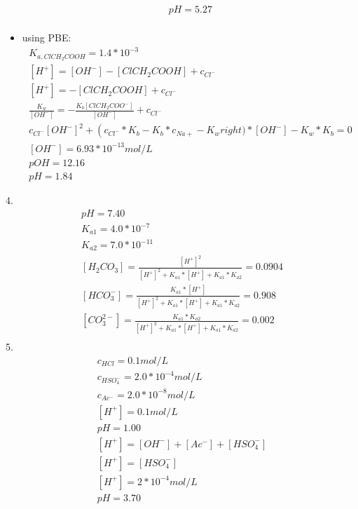 \documentclass{article}
\begin{document}
\begin{itemize}
\begin{equation}
\begin{multlined}
            pH = 5.27\\
        \end{multlined}
    \end{equation}
    \item
    using PBE:
    \begin{equation}
        \begin{multlined}
            K_{a, ClCH_2COOH} = 1.4*10^{-3}\\
            \left[H^+\right] = \left[OH^-\right] - \left[ClCH_2COOH\right] + c_{Cl^-}\\
            \left[H^+\right] = - \left[ClCH_2COOH\right] + c_{Cl^-}\\
            \frac{K_w}{\left[OH^-\right]} = -\frac{K_b\left[ClCH_2COO^-\right]}{\left[OH^-\right]} + c_{Cl^-}\\
            c_{Cl^-}\left[OH^-\right]^2 + \left(c_{Cl^-}*K_b - K_b*c_{Na+} - K_w right)*\left[OH^-\right]-K_w*K_b = 0\\
            \left[OH^-\right] = 6.93*10^{-13}mol/L\\
            pOH = 12.16\\
            pH = 1.84
        \end{multlined}
    \end{equation}
\end{itemize}
4.\begin{equation}
    \begin{multlined}
        pH = 7.40\\
        K_{a1} = 4.0*10^{-7}\\
        K_{a2} = 7.0*10^{-11}\\
        \left[H_2CO_3\right] = \frac{\left[H^+\right]^2}{\left[H^+\right]^2+ K_{a1}*\left[H^+\right]+K_{a1}*K_{a2}} = 0.0904\\
        \left[HCO_3^-\right] = \frac{K_{a1}*\left[H^+\right]}{\left[H^+\right]^2+ K_{a1}*\left[H^+\right]+K_{a1}*K_{a2}} = 0.908\\
        \left[CO_3^{2-}\right] = \frac{K_{a1}*K_{a2}}{\left[H^+\right]^2+ K_{a1}*\left[H^+\right]+K_{a1}*K_{a2}} = 0.002\\
    \end{multlined}
\end{equation}
5. \begin{equation}
    \begin{multlined}
        c_{HCl} = 0.1mol/L\\
        c_{HSO_4^-} = 2.0*10^{-4}mol/L\\
        c_{Ac^-} = 2.0*10^{-8}mol/L\\
        \left[H^+\right] = 0.1 mol/L\\
        pH = 1.00\\
        \left[H^+\right] = \left[OH^-\right] + \left[Ac^-\right] + \left[HSO_4^-\right]\\
        \left[H^+\right] = \left[HSO_4^-\right]\\
        \left[H^+\right] = 2*10^{-4}mol/L\\
        pH = 3.70\\
    \end{multlined}
\end{equation}
\end{document}
